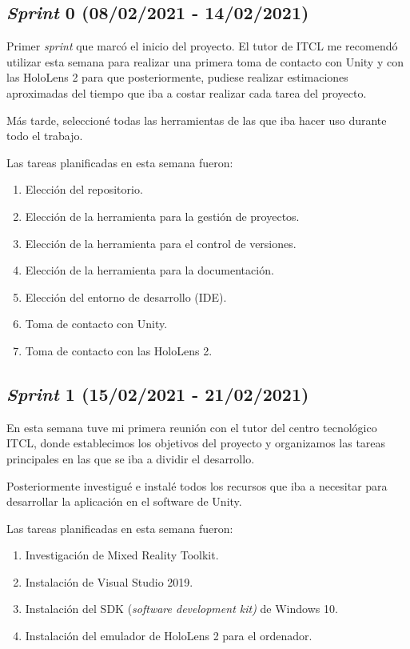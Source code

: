 \subsection{\textit{Sprint} 0 (08/02/2021 - 14/02/2021)}
Primer \textit{sprint} que marcó el inicio del proyecto. El tutor de ITCL me recomendó utilizar esta semana para realizar una primera toma de contacto con Unity y con las HoloLens 2 para que posteriormente, pudiese realizar estimaciones aproximadas del tiempo que iba a costar realizar cada tarea del proyecto.

Más tarde, seleccioné todas las herramientas de las que iba hacer uso durante todo el trabajo.

Las tareas planificadas en esta semana fueron:
\begin{enumerate}
    \item Elección del repositorio.
    \item Elección de la herramienta para la gestión de proyectos.
    \item Elección de la herramienta para el control de versiones.
    \item Elección de la herramienta para la documentación.
    \item Elección del entorno de desarrollo (IDE).
    \item Toma de contacto con Unity.
    \item Toma de contacto con las HoloLens 2.
\end{enumerate}
\subsection{\textit{Sprint} 1 (15/02/2021 - 21/02/2021)}
En esta semana tuve mi primera reunión con el tutor del centro tecnológico ITCL, donde establecimos los objetivos del proyecto y organizamos las tareas principales en las que se iba a dividir el desarrollo. 

Posteriormente investigué e instalé todos los recursos que iba a necesitar para desarrollar la aplicación en el software de Unity.

Las tareas planificadas en esta semana fueron:
\begin{enumerate}
    \item Investigación de Mixed Reality Toolkit.
    \item Instalación de Visual Studio 2019.
    \item Instalación del SDK (\textit{software development kit)} de Windows 10.
    \item Instalación del emulador de HoloLens 2 para el ordenador.
\end{enumerate}
